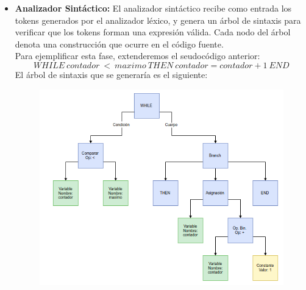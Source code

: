 \documentclass[a4paper,12pt]{article}
\begin{document}
\begin{enumerate}
\begin{itemize}
  \item \textbf{Analizador Sintáctico:} El analizador sintáctico recibe como entrada los tokens generados por el
  analizador léxico, y genera un árbol de sintaxis para verificar que los tokens forman una expresión válida. Cada
  nodo del árbol denota una construcción que ocurre en el código fuente. \\
  Para ejemplificar esta fase, extenderemos el seudocódigo anterior:
  $$WHILE\:contador\:<\:maximo\:THEN\:contador=contador + 1\:END$$
  El árbol de sintaxis que se generaría es el siguiente:
  \begin{figure}[H]
   \centering
   \includegraphics[scale = 0.6]{1.png}
  \end{figure}
  

\end{itemize}
\end{enumerate}
\end{document}

